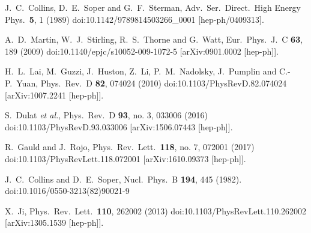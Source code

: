 \documentclass[english,preprint,aps,prd,showpacs,superscriptaddress,nofootinbib,tightenlines]{revtex4}
\begin{document}
\begin{thebibliography}{99}
  J.~C.~Collins, D.~E.~Soper and G.~F.~Sterman,
  Adv.\ Ser.\ Direct.\ High Energy Phys.\  {\bf 5}, 1 (1989)
  doi:10.1142/9789814503266\_0001
  [hep-ph/0409313].

  A.~D.~Martin, W.~J.~Stirling, R.~S.~Thorne and G.~Watt,
  Eur.\ Phys.\ J.\ C {\bf 63}, 189 (2009)
  doi:10.1140/epjc/s10052-009-1072-5
  [arXiv:0901.0002 [hep-ph]].

  H.~L.~Lai, M.~Guzzi, J.~Huston, Z.~Li, P.~M.~Nadolsky, J.~Pumplin and C.-P.~Yuan,
  Phys.\ Rev.\ D {\bf 82}, 074024 (2010)
  doi:10.1103/PhysRevD.82.074024
  [arXiv:1007.2241 [hep-ph]].

  S.~Dulat {\it et al.},
  Phys.\ Rev.\ D {\bf 93}, no. 3, 033006 (2016)
  doi:10.1103/PhysRevD.93.033006
  [arXiv:1506.07443 [hep-ph]].

  R.~Gauld and J.~Rojo,
  Phys.\ Rev.\ Lett.\  {\bf 118}, no. 7, 072001 (2017)
  doi:10.1103/PhysRevLett.118.072001
  [arXiv:1610.09373 [hep-ph]].

  J.~C.~Collins and D.~E.~Soper,
  Nucl.\ Phys.\ B {\bf 194}, 445 (1982).
  doi:10.1016/0550-3213(82)90021-9

  X.~Ji,
  Phys.\ Rev.\ Lett.\  {\bf 110}, 262002 (2013)
  doi:10.1103/PhysRevLett.110.262002
  [arXiv:1305.1539 [hep-ph]].



\end{thebibliography}
\end{document}
